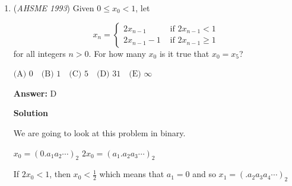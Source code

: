 \begin{enumerate}
Let $a,$ $b,$ and $c$ be the side lengths of the rectangular prism. By Pythagoras, the lengths of the external diagonals are $\sqrt{a^2 + b^2},$ $\sqrt{b^2 + c^2},$ and $\sqrt{a^2 + c^2}.$ If we square each of these to obtain $a^2 + b^2,$ $b^2 + c^2,$ and $a^2 + c^2,$ we observe that since each of $a,$ $b,$ and $c$ are positive, then the sum of any two of the squared diagonal lengths must be larger than the square of the third diagonal length. For example, $(a^2 + b^2) + (b^2 + c^2) = (a^2 + c^2) + 2b^2 > a^2 + c^2$ because $2b^2 > 0.$

 Thus, we test each answer choice to see if the sum of the squares of the two smaller numbers is larger than the square of the largest number. Looking at choice (B), we see that $4^2 + 5^2 = 41 < 7^2 = 49,$ so the answer is $\boxed{\text{(B) \{4, 5, 7\}}}.$

 --goldentail141

 



\textbf{Solution 2}

Let $a,$ $b,$ and $c$ be the side lengths of the rectangular prism. We then have:$a^2+b^2=i^2,$$b^2+c^2=j^2,$$c^2+a^2=k^2$where $\{ i,j,k \}$ are the given diagonal lengths. WLOG, let $i \leq j \leq k.$ It suffices to check if $i^2+j^2 \geq k.$ We see that for $\boxed{B}$, $4^2+5^2 = 16 + 25 = 41 < 7^2 = 49$, so this case is impossible.

 


	\item (\textit{AHSME 1993}) Given $0\le x_0<1$, let 

 \[x_n=\left\{ \begin{array}{ll} 2x_{n-1} &\text{ if }2x_{n-1}<1 \\ 2x_{n-1}-1 &\text{ if }2x_{n-1}\ge 1 \end{array}\right.\]
for all integers $n>0$. For how many $x_0$ is it true that $x_0=x_5$?


 $\text{(A) 0} \quad \text{(B) 1} \quad \text{(C) 5} \quad \text{(D) 31} \quad \text{(E) }\infty$

 \textbf{Answer: }D



\textbf{Solution}

We are going to look at this problem in binary. 

 $x_0 = (0.a_1 a_2 \cdots )_2$
$2x_0 = (a_1.a_2 a_3 \cdots)_2$

 If $2x_0 < 1$, then $x_0 < \frac{1}{2}$ which means that $a_1 = 0$ and so $x_1 = (.a_2 a_3 a_4 \cdots)_2$


\end{enumerate}
